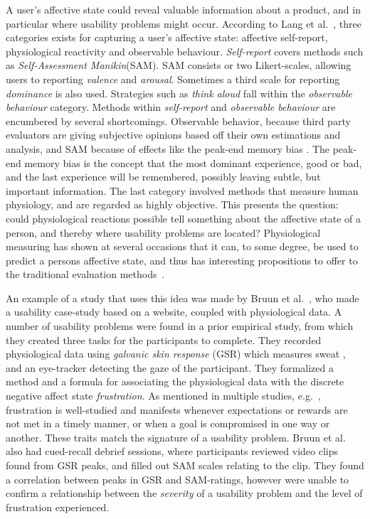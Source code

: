 A user's affective state could reveal valuable information about a product, and in particular where usability problems might occur. 
According to Lang et al.~\cite{BRADLEY199449}, three categories exists for capturing a user's affective state: affective self-report, physiological reactivity and
observable behaviour. 
\textit{Self-report} covers methods such as \textit{Self-Assessment Manikin}(SAM). SAM consists or two Likert-scales,
allowing users to reporting \textit{valence} and \textit{arousal}. Sometimes a third scale for reporting
\textit{dominance} is also used.
Strategies such as \textit{think aloud} fall within the \textit{observable behaviour} category.
Methods within \textit{self-report} and \textit{observable behaviour} are encumbered by several shortcomings.
Observable behavior, because third party evaluators are giving subjective opinions based off their own estimations and
analysis, and SAM because of effects like the peak-end memory bias \cite{cockburn_peakend}.
The peak-end memory bias is the concept that the most dominant experience, good or bad, and the last experience will be
remembered, possibly leaving subtle, but important information.
The last category involved methods that measure human physiology, and are regarded as highly objective.
This presents the question: could physiological reactions possible tell something about the affective state of a person,
and thereby where usability problems are located?
Physiological measuring has shown at several occasions that it can, to some degree, be used to predict a persons
affective state, and thus has interesting propositions to offer to the traditional evaluation methods~\cite{eeg_facial_expressions,fusion4,90_percent_eeg_emotion}.

An example of a study that uses this idea was made by Bruun et al.~\cite{LH-paper}, who made a usability case-study
based on a website, coupled with physiological data.
A number of usability problems were found in a prior empirical study, from which they created three tasks for the participants to complete.
They recorded physiological data using \textit{galvanic skin response} (GSR) which measures sweat \cite{gsr_calibration}, and an eye-tracker detecting the gaze of the participant.
They formalized a method and a formula for associating the physiological data with the discrete negative affect state \textit{frustration}.
As mentioned in multiple studies, e.g.~\cite{LH-paper,frustration_with_computers}, frustration is well-studied
and manifests whenever expectations or rewards are not met in a timely manner, or when a goal is compromised in one way or another.
These traits match the signature of a usability problem.
Bruun et al. also had cued-recall debrief sessions, where participants reviewed video clips found from GSR peaks, and filled out SAM scales relating to the clip. 
They found a correlation between peaks in GSR and SAM-ratings, however were unable to confirm a relationship between the
\textit{severity} of a usability problem and the level of frustration experienced.

